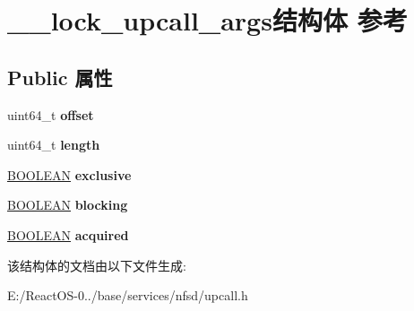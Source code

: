 \hypertarget{struct____lock__upcall__args}{}\section{\+\_\+\+\_\+lock\+\_\+upcall\+\_\+args结构体 参考}
\label{struct____lock__upcall__args}
\subsection*{Public 属性}
\begin{DoxyCompactItemize}
\item 
\mbox{\label{struct____lock__upcall__args_aea12afe3a7ae0ad4677a98cb250496b0}} 
uint64\+\_\+t {\bfseries offset}
\item 
\mbox{\label{struct____lock__upcall__args_aae846cf5ad82dae346eed504f30e88e2}} 
uint64\+\_\+t {\bfseries length}
\item 
\mbox{\label{struct____lock__upcall__args_aa17c7a292322ee61f367b69119f687ca}} 
\hyperlink{_processor_bind_8h_a112e3146cb38b6ee95e64d85842e380a}{B\+O\+O\+L\+E\+AN} {\bfseries exclusive}
\item 
\mbox{\label{struct____lock__upcall__args_a0d542b9c1fb6653be4d239af28c744ef}} 
\hyperlink{_processor_bind_8h_a112e3146cb38b6ee95e64d85842e380a}{B\+O\+O\+L\+E\+AN} {\bfseries blocking}
\item 
\mbox{\label{struct____lock__upcall__args_acdf1be1e067377e0aef2363d0805dba2}} 
\hyperlink{_processor_bind_8h_a112e3146cb38b6ee95e64d85842e380a}{B\+O\+O\+L\+E\+AN} {\bfseries acquired}
\end{DoxyCompactItemize}


该结构体的文档由以下文件生成\+:\begin{DoxyCompactItemize}
\item 
E\+:/\+React\+O\+S-\/0../base/services/nfsd/upcall.\+h\end{DoxyCompactItemize}
